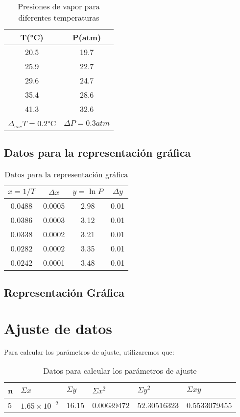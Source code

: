 \documentclass[a4paper,12pt]{article}
\begin{document}
\begin{table}[H]
\centering
\caption{Presiones de vapor para diferentes temperaturas}
  \begin{tabular}{|c|c|}
  \hline
    T(°C)                  & P(atm)           \\ \hline
    20.5                   & 19.7             \\ \hline
    25.9                   & 22.7             \\ \hline
    29.6                   & 24.7             \\ \hline
    35.4                   & 28.6             \\ \hline
    41.3                   & 32.6             \\ \hline
    $\Delta_{esc} T = 0.2$°C & $\Delta P = 0.3 atm$ \\ \hline
  \end{tabular}
\end{table}
\subsection{Datos para la representación gráfica}
\begin{table}[H]
  \centering
  \caption{Datos para la representación gráfica}
  \begin{tabular}{|c|c|c|c|}
    \hline
    $x=1/T$ & $\Delta x$ & $y=\ln P$ & $\Delta y$ \\ \hline
    0.0488  & 0.0005     & 2.98     & 0.01       \\ \hline
    0.0386  & 0.0003     & 3.12     & 0.01       \\ \hline
    0.0338  & 0.0002     & 3.21     & 0.01       \\ \hline
    0.0282  & 0.0002     & 3.35     & 0.01       \\ \hline
    0.0242  & 0.0001     & 3.48     & 0.01       \\ \hline

  \end{tabular}
\end{table}
\subsection{Representación Gráfica}
\pagebreak

\section{Ajuste de datos}
Para calcular los parámetros de ajuste, utilizaremos que:
\begin{table}[H]
\caption{Datos para calcular los parámetros de ajuste}
\begin{tabular}{|l|l|l|l|l|l|}
\hline
n & $\Sigma x$ & $\Sigma y$ & $\Sigma x^2$ & $\Sigma y^2$ & $\Sigma x y$ \\ \hline
5 & $1.65 \times 10^{-2} $    & 16.15      & 0.00639472   & 52.30516323  & 0.5533079455 \\ \hline
\end{tabular}
\end{table}
\end{document}
